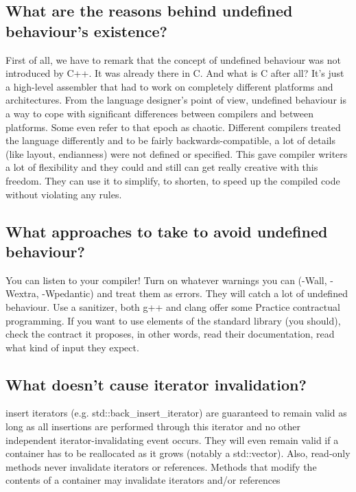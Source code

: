 \documentclass{report}
\begin{document}
\subsection{What are the reasons behind undefined behaviour’s existence?}
\bigbreak \noindent 
First of all, we have to remark that the concept of undefined
behaviour was not introduced by C++. It was already there in C.
\bigbreak \noindent 
And what is C after all? It’s just a high-level assembler that had to
work on completely different platforms and architectures.
\bigbreak \noindent 
From the language designer’s point of view, undefined behaviour
is a way to cope with significant differences between compilers
and between platforms. Some even refer to that epoch as chaotic.
Different compilers treated the language differently and to be fairly
backwards-compatible, a lot of details (like layout, endianness)
were not defined or specified.
\bigbreak \noindent 
This gave compiler writers a lot of flexibility and they could and
still can get really creative with this freedom. They can use it
to simplify, to shorten, to speed up the compiled code without
violating any rules.

\bigbreak \noindent 
\subsection{What approaches to take to avoid undefined behaviour?}
\bigbreak \noindent 
You can listen to your compiler! Turn on whatever warnings you can (-Wall, -Wextra, -Wpedantic) and treat them as errors. They will catch a lot of undefined behaviour.
\bigbreak \noindent 
Use a sanitizer, both g++ and clang offer some
\bigbreak \noindent 
Practice contractual programming. If you want to use elements of the standard library (you should), check the contract
it proposes, in other words, read their documentation, read
what kind of input they expect.

\bigbreak \noindent 
\subsection{What doesn't cause iterator invalidation? }
\bigbreak \noindent 
insert iterators (e.g. std::back\_insert\_iterator)
are guaranteed to remain valid as long as all insertions are
performed through this iterator and no other independent
iterator-invalidating event occurs. They will even remain valid if a
container has to be reallocated as it grows (notably a std::vector).
\bigbreak \noindent 
Also, read-only methods never invalidate iterators or references.
Methods that modify the contents of a container may invalidate
iterators and/or references
\end{document}
